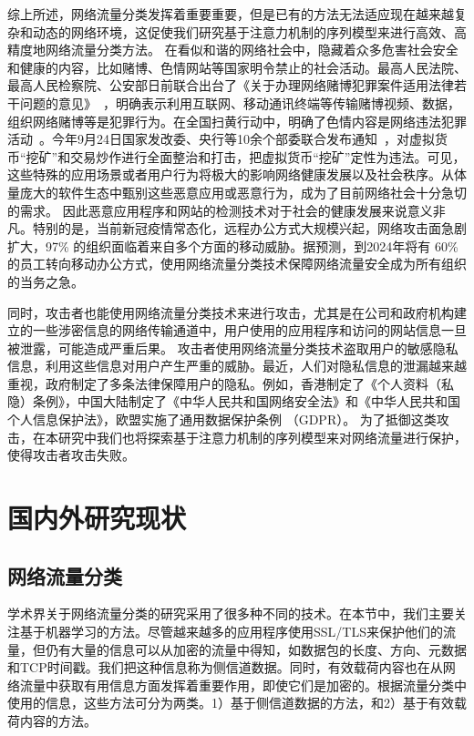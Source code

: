 \documentclass[degree=master,cjk-font=noto]{thuthesis}
\begin{document}
综上所述，网络流量分类发挥着重要重要，但是已有的方法无法适应现在越来越复杂和动态的网络环境，这促使我们研究基于注意力机制的序列模型来进行高效、高精度地网络流量分类方法。
在看似和谐的网络社会中，隐藏着众多危害社会安全和健康的内容，比如赌博、色情网站等国家明令禁止的社会活动。最高人民法院、最高人民检察院、公安部日前联合出台了《关于办理网络赌博犯罪案件适用法律若干问题的意见》~\cite{intro-9}，明确表示利用互联网、移动通讯终端等传输赌博视频、数据，组织网络赌博等是犯罪行为。在全国扫黄行动中，明确了色情内容是网络违法犯罪活动~\cite{intro-10}。今年9月24日国家发改委、央行等10余个部委联合发布通知~\cite{intro-11}，对虚拟货币“挖矿”和交易炒作进行全面整治和打击，把虚拟货币“挖矿”定性为违法。可见，这些特殊的应用场景或者用户行为将极大的影响网络健康发展以及社会秩序。从体量庞大的软件生态中甄别这些恶意应用或恶意行为，成为了目前网络社会十分急切的需求。
因此恶意应用程序和网站的检测技术对于社会的健康发展来说意义非凡。特别的是，当前新冠疫情常态化，远程办公方式大规模兴起，网络攻击面急剧扩大，97\% 的组织面临着来自多个方面的移动威胁。据预测，到2024年将有 60\% 的员工转向移动办公方式，使用网络流量分类技术保障网络流量安全成为所有组织的当务之急。


同时，攻击者也能使用网络流量分类技术来进行攻击，尤其是在公司和政府机构建立的一些涉密信息的网络传输通道中，用户使用的应用程序和访问的网站信息一旦被泄露，可能造成严重后果。
攻击者使用网络流量分类技术盗取用户的敏感隐私信息，利用这些信息对用户产生严重的威胁。最近，人们对隐私信息的泄漏越来越重视，政府制定了多条法律保障用户的隐私。例如，香港制定了《个人资料（私隐）条例》，中国大陆制定了《中华人民共和国网络安全法》和《中华人民共和国个人信息保护法》，欧盟实施了通用数据保护条例 （GDPR）。
为了抵御这类攻击，在本研究中我们也将探索基于注意力机制的序列模型来对网络流量进行保护，使得攻击者攻击失败。


\chapter{国内外研究现状}

\section{网络流量分类}

学术界关于网络流量分类的研究采用了很多种不同的技术。在本节中，我们主要关注基于机器学习的方法。尽管越来越多的应用程序使用SSL/TLS来保护他们的流量，但仍有大量的信息可以从加密的流量中得知，如数据包的长度、方向、元数据和TCP时间戳。我们把这种信息称为侧信道数据。同时，有效载荷内容也在从网络流量中获取有用信息方面发挥着重要作用，即使它们是加密的。根据流量分类中使用的信息，这些方法可分为两类。1）基于侧信道数据的方法，和2）基于有效载荷内容的方法。
\end{document}
